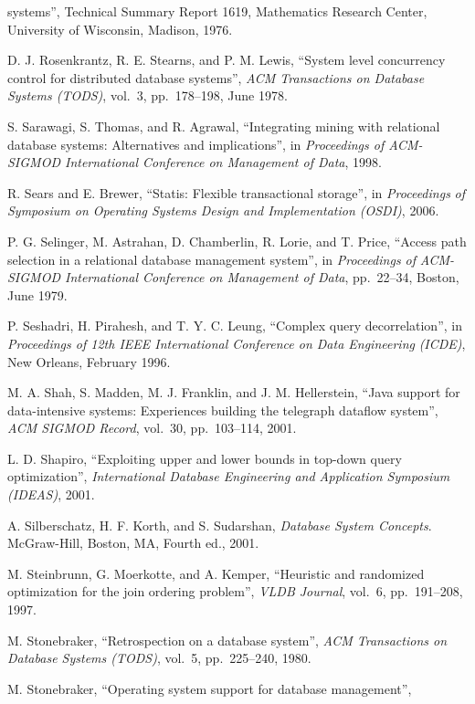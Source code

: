 \documentclass[a4paper,11pt,twoside,openright]{book}
\begin{document}
\begin{enumerate}[label={[\arabic*]}]
  systems'', Technical Summary Report 1619, Mathematics Research Center,
  University of Wisconsin, Madison, 1976.
\item
  D. J. Rosenkrantz, R. E. Stearns, and P. M. Lewis, ``System level
  concurrency control for distributed database systems'', \emph{ACM
  Transactions on Database Systems (TODS)}, vol.~3, pp.~178--198, June
  1978.
\item
  S. Sarawagi, S. Thomas, and R. Agrawal, ``Integrating mining with
  relational database systems: Alternatives and implications'', in
  \emph{Proceedings of ACM-SIGMOD International Conference on Management
  of Data}, 1998.
\item
  R. Sears and E. Brewer, ``Statis: Flexible transactional storage'', in
  \emph{Proceedings} \emph{of Symposium on Operating Systems Design and
  Implementation (OSDI)}, 2006.
\item
  P. G. Selinger, M. Astrahan, D. Chamberlin, R. Lorie, and T. Price,
  ``Access path selection in a relational database management system'',
  in \emph{Proceedings of} \emph{ACM-SIGMOD International Conference on
  Management of Data}, pp.~22--34, Boston, June 1979.
\item
  P. Seshadri, H. Pirahesh, and T. Y. C. Leung, ``Complex query
  decorrelation'', in \emph{Proceedings of 12th IEEE International
  Conference on Data Engineering} \emph{(ICDE)}, New Orleans, February
  1996.
\item
  M. A. Shah, S. Madden, M. J. Franklin, and J. M. Hellerstein, ``Java
  support for data-intensive systems: Experiences building the telegraph
  dataflow system'', \emph{ACM SIGMOD Record}, vol.~30, pp.~103--114,
  2001.
\item
  L. D. Shapiro, ``Exploiting upper and lower bounds in top-down query
  optimization'', \emph{International Database Engineering and
  Application Symposium} \emph{(IDEAS)}, 2001.
\item
  A. Silberschatz, H. F. Korth, and S. Sudarshan, \emph{Database System
  Concepts}. McGraw-Hill, Boston, MA, Fourth ed., 2001.
\item
  M. Steinbrunn, G. Moerkotte, and A. Kemper, ``Heuristic and randomized
  optimization for the join ordering problem'', \emph{VLDB Journal},
  vol.~6, pp.~191--208, 1997.
\item
  M. Stonebraker, ``Retrospection on a database system'', \emph{ACM
  Transactions on} \emph{Database Systems (TODS)}, vol.~5, pp.~225--240,
  1980.
\item
  M. Stonebraker, ``Operating system support for database management'',

\end{enumerate}
\end{document}
